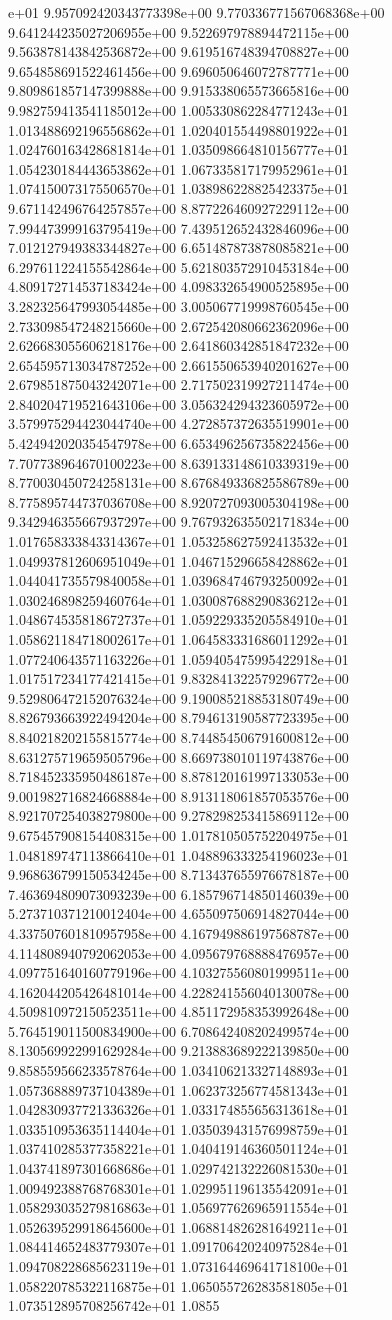 e+01	9.957092420343773398e+00	9.770336771567068368e+00	9.641244235027206955e+00	9.522697978894472115e+00	9.563878143842536872e+00	9.619516748394708827e+00	9.654858691522461456e+00	9.696050646072787771e+00	9.809861857147399888e+00	9.915338065573665816e+00	9.982759413541185012e+00	1.005330862284771243e+01	1.013488692196556862e+01	1.020401554498801922e+01	1.024760163428681814e+01	1.035098664810156777e+01	1.054230184443653862e+01	1.067335817179952961e+01	1.074150073175506570e+01	1.038986228825423375e+01	9.671142496764257857e+00	8.877226460927229112e+00	7.994473999163795419e+00	7.439512652432846096e+00	7.012127949383344827e+00	6.651487873878085821e+00	6.297611224155542864e+00	5.621803572910453184e+00	4.809172714537183424e+00	4.098332654900525895e+00	3.282325647993054485e+00	3.005067719998760545e+00	2.733098547248215660e+00	2.672542080662362096e+00	2.626683055606218176e+00	2.641860342851847232e+00	2.654595713034787252e+00	2.661550653940201627e+00	2.679851875043242071e+00	2.717502319927211474e+00	2.840204719521643106e+00	3.056324294323605972e+00	3.579975294423044740e+00	4.272857372635519901e+00	5.424942020354547978e+00	6.653496256735822456e+00	7.707738964670100223e+00	8.639133148610339319e+00	8.770030450724258131e+00	8.676849336825586789e+00	8.775895744737036708e+00	8.920727093005304198e+00	9.342946355667937297e+00	9.767932635502171834e+00	1.017658333843314367e+01	1.053258627592413532e+01	1.049937812606951049e+01	1.046715296658428862e+01	1.044041735579840058e+01	1.039684746793250092e+01	1.030246898259460764e+01	1.030087688290836212e+01	1.048674535818672737e+01	1.059229335205584910e+01	1.058621184718002617e+01	1.064583331686011292e+01	1.077240643571163226e+01	1.059405475995422918e+01	1.017517234177421415e+01	9.832841322579296772e+00	9.529806472152076324e+00	9.190085218853180749e+00	8.826793663922494204e+00	8.794613190587723395e+00	8.840218202155815774e+00	8.744854506791600812e+00	8.631275719659505796e+00	8.669738010119743876e+00	8.718452335950486187e+00	8.878120161997133053e+00	9.001982716824668884e+00	8.913118061857053576e+00	8.921707254038279800e+00	9.278298253415869112e+00	9.675457908154408315e+00	1.017810505752204975e+01	1.048189747113866410e+01	1.048896333254196023e+01	9.968636799150534245e+00	8.713437655976678187e+00	7.463694809073093239e+00	6.185796714850146039e+00	5.273710371210012404e+00	4.655097506914827044e+00	4.337507601810957958e+00	4.167949886197568787e+00	4.114808940792062053e+00	4.095679768888476957e+00	4.097751640160779196e+00	4.103275560801999511e+00	4.162044205426481014e+00	4.228241556040130078e+00	4.509810972150523511e+00	4.851172958353992648e+00	5.764519011500834900e+00	6.708642408202499574e+00	8.130569922991629284e+00	9.213883689222139850e+00	9.858559566233578764e+00	1.034106213327148893e+01	1.057368889737104389e+01	1.062373256774581343e+01	1.042830937721336326e+01	1.033174855656313618e+01	1.033510953635114404e+01	1.035039431576998759e+01	1.037410285377358221e+01	1.040419146360501124e+01	1.043741897301668686e+01	1.029742132226081530e+01	1.009492388768768301e+01	1.029951196135542091e+01	1.058293035279816863e+01	1.056977626965911554e+01	1.052639529918645600e+01	1.068814826281649211e+01	1.084414652483779307e+01	1.091706420240975284e+01	1.094708228685623119e+01	1.073164469641718100e+01	1.058220785322116875e+01	1.065055726283581805e+01	1.073512895708256742e+01	1.0855